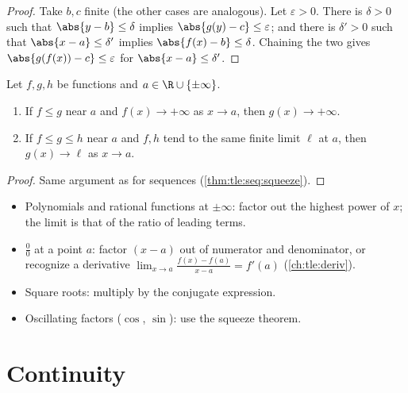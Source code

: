\begin{proof}
Take $b, c$ finite (the other cases are analogous). Let $\varepsilon > 0$.
There is $\delta > 0$ such that $\abs{y - b} \leq \delta$ implies
$\abs{g(y) - c} \leq \varepsilon$; and there is $\delta' > 0$ such that
$\abs{x - a} \leq \delta'$ implies $\abs{f(x) - b} \leq \delta$. Chaining the
two gives $\abs{g(f(x)) - c} \leq \varepsilon$ for
$\abs{x - a} \leq \delta'$.
\end{proof}

\begin{theorem}\label{thm:tle:limcont:squeeze}
Let $f, g, h$ be functions and $a \in \R \cup \{\pm\infty\}$.
\begin{enumerate}
  \item If $f \leq g$ near $a$ and $f(x) \to +\infty$ as $x \to a$, then
        $g(x) \to +\infty$.
  \item If $f \leq g \leq h$ near $a$ and $f, h$ tend to the same finite
        limit $\ell$ at $a$, then $g(x) \to \ell$ as $x \to a$.
\end{enumerate}
\end{theorem}

\begin{proof}
Same argument as for sequences (\cref{thm:tle:seq:squeeze}).
\end{proof}

\begin{method}\label{met:tle:limcont:limits}
\begin{itemize}
  \item Polynomials and rational functions at $\pm\infty$: factor out the
        highest power of $x$; the limit is that of the ratio of leading
        terms.
  \item $\frac{0}{0}$ at a point $a$: factor $(x-a)$ out of numerator and
        denominator, or recognize a derivative
        $\lim_{x\to a}\frac{f(x)-f(a)}{x-a} = f'(a)$ (\cref{ch:tle:deriv}).
  \item Square roots: multiply by the conjugate expression.
  \item Oscillating factors ($\cos$, $\sin$): use the squeeze theorem.
\end{itemize}
\end{method}

\section{Continuity}


